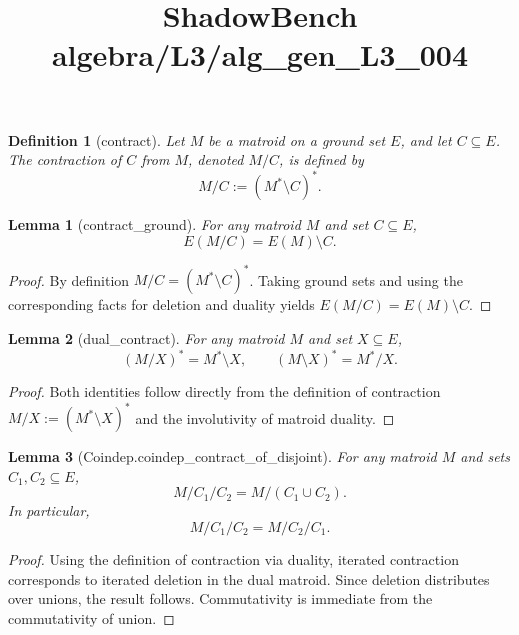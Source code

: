 \documentclass{article}
\title{ShadowBench algebra/L3/alg\_gen\_L3\_004}
\newtheorem{lemma}{Lemma}
\newtheorem{definition}{Definition}
\begin{document}
\maketitle

\begin{definition}[contract]
Let \( M \) be a matroid on a ground set \( E \), and let \( C \subseteq E \).
The \emph{contraction} of \( C \) from \( M \), denoted \( M / C \), is defined by
\[
M / C := (M^\ast \setminus C)^\ast .
\]
\end{definition}

\begin{lemma}[contract_ground]
For any matroid \( M \) and set \( C \subseteq E \),
\[
E(M / C) = E(M) \setminus C .
\]
\end{lemma}

\begin{proof}
By definition \( M / C = (M^\ast \setminus C)^\ast \).
Taking ground sets and using the corresponding facts for deletion and duality yields
\( E(M / C) = E(M) \setminus C \).
\end{proof}

\begin{lemma}[dual_contract]
For any matroid \( M \) and set \( X \subseteq E \),
\[
(M / X)^\ast = M^\ast \setminus X,
\qquad
(M \setminus X)^\ast = M^\ast / X .
\]
\end{lemma}

\begin{proof}
Both identities follow directly from the definition of contraction
\( M / X := (M^\ast \setminus X)^\ast \) and the involutivity of matroid duality.
\end{proof}

\begin{lemma}[Coindep.coindep_contract_of_disjoint]
For any matroid \( M \) and sets \( C_1, C_2 \subseteq E \),
\[
M / C_1 / C_2 = M / (C_1 \cup C_2).
\]
In particular,
\[
M / C_1 / C_2 = M / C_2 / C_1 .
\]
\end{lemma}

\begin{proof}
Using the definition of contraction via duality, iterated contraction corresponds to
iterated deletion in the dual matroid.
Since deletion distributes over unions, the result follows.
Commutativity is immediate from the commutativity of union.
\end{proof}
\end{document}

